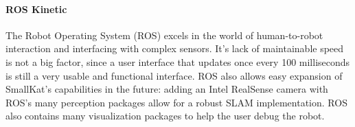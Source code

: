         \paragraph*{ROS Kinetic}
        The Robot Operating System (ROS) excels in the world of human-to-robot interaction and interfacing with complex sensors. It's lack of maintainable speed is not a big factor, since a user interface that updates once every 100 milliseconds is still a very usable and functional interface. ROS also allows easy expansion of SmallKat's capabilities in the future: adding an Intel RealSense camera with ROS's many perception packages allow for a robust SLAM implementation. ROS also contains many visualization packages to help the user debug the robot.




